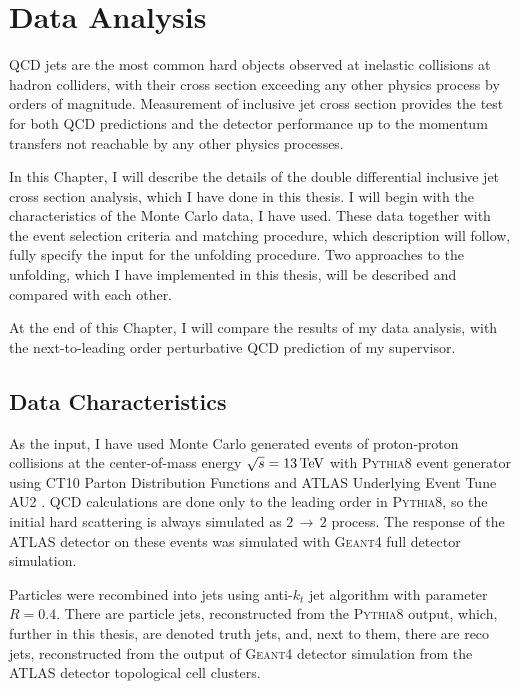 \chapter{Data Analysis}


QCD jets are the most common hard objects observed at inelastic collisions 
at hadron colliders, with their cross section exceeding any other
physics process by orders of magnitude.  Measurement of inclusive jet cross
section provides the test for both QCD predictions and the detector
performance up to the momentum transfers not reachable by any other physics
processes. 

In this Chapter, I will describe the details of the double differential
inclusive jet cross section analysis, which I have done in this thesis.
I will begin with the characteristics of the Monte Carlo data, I have used.
These data together with the event selection criteria and matching procedure,
which description will follow, fully specify the input for the unfolding
procedure. Two approaches to the unfolding, which I have implemented in this
thesis, will be described and compared with each other. 

At the end of this Chapter, I will compare the results of my data analysis, with
the next-to-leading order perturbative QCD prediction of my supervisor. 

\section{Data Characteristics}

As the input, I have used Monte Carlo generated events of proton-proton collisions at
the center-of-mass energy $\sqrt{s} = 13\,\text{TeV}$ with \textsc{Pythia8}
\cite{Pythia8} event generator using CT10 Parton Distribution Functions
\cite{CT10PDF} and ATLAS Underlying Event Tune AU2 \cite{AU2}. QCD calculations
are done only to the leading order in \textsc{Pythia8}, so the initial hard
scattering is always simulated as $2\,\rightarrow\,2$ process. The response of
the ATLAS detector on these events was simulated with \textsc{Geant4}
\cite{Geant4} full detector simulation.

Particles were recombined into jets using anti-$k_t$ jet algorithm with
parameter $R=0.4$. There are particle jets, reconstructed from the
\textsc{Pythia8} output, which, further in this thesis, are denoted truth jets,
and, next to them, there are reco jets, reconstructed from the output of
\textsc{Geant4} detector simulation from the ATLAS detector topological cell
clusters. 

